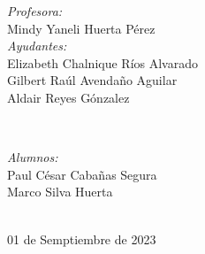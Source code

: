 \begin{titlepage}
\vspace{10mm}
\begin{minipage}{0.7\textwidth}
    \begin{flushleft} \large
        \emph{Profesora:}\\
            Mindy Yaneli Huerta Pérez \\
            \vspace{3mm}
            \emph{Ayudantes:}\\
            Elizabeth Chalnique Ríos Alvarado \\
            Gilbert Raúl Avendaño Aguilar \\
            Aldair Reyes Gónzalez
    \end{flushleft}
\end{minipage}
\\
\vspace{20mm}
\begin{minipage}{0.4\textwidth}
    \begin{flushright} \large
    \centering
        \emph{Alumnos:} \\ %
        \vspace{4mm}
        Paul César Cabañas Segura\\
        \vspace{3mm}
        Marco Silva Huerta \\        
    \end{flushright}
\end{minipage}\\[2.6cm]
\makeatother
{\large 01 de Semptiembre de 2023}\\[2cm]
\vfill 
\end{titlepage}